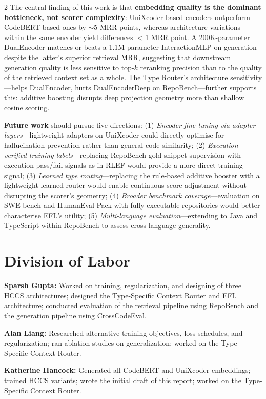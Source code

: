\documentclass[11pt,a4paper]{article}
\begin{document}
\begin{multicols}{2}
The central finding of this work is that \textbf{embedding quality is the dominant bottleneck, not scorer complexity}: UniXcoder-based encoders outperform CodeBERT-based ones by $\sim$5 MRR points, whereas architecture variations within the same encoder yield differences $<$1 MRR point. A 200K-parameter DualEncoder matches or beats a 1.1M-parameter InteractionMLP on generation despite the latter's superior retrieval MRR, suggesting that downstream generation quality is less sensitive to top-$k$ reranking precision than to the quality of the retrieved context set as a whole. The Type Router's architecture sensitivity---helps DualEncoder, hurts DualEncoderDeep on RepoBench---further supports this: additive boosting disrupts deep projection geometry more than shallow cosine scoring.

\textbf{Future work} should pursue five directions: (1) \textit{Encoder fine-tuning via adapter layers}---lightweight adapters on UniXcoder could directly optimise for hallucination-prevention rather than general code similarity; (2) \textit{Execution-verified training labels}---replacing RepoBench gold-snippet supervision with execution pass/fail signals as in RLEF \citep{gehring2024rlef} would provide a more direct training signal; (3) \textit{Learned type routing}---replacing the rule-based additive booster with a lightweight learned router would enable continuous score adjustment without disrupting the scorer's geometry; (4) \textit{Broader benchmark coverage}---evaluation on SWE-bench and HumanEval-Pack with fully executable repositories would better characterise EFL's utility; (5) \textit{Multi-language evaluation}---extending to Java and TypeScript within RepoBench to assess cross-language generality.

\section{Division of Labor}

\noindent\textbf{Sparsh Gupta:} Worked on training, regularization, and designing of three HCCS architectures; designed the Type-Specific Context Router and EFL architecture; conducted evaluation of the retrieval pipeline using RepoBench and the generation pipeline using CrossCodeEval.

\noindent\textbf{Alan Liang:} Researched alternative training objectives, loss schedules, and regularization; ran ablation studies on generalization; worked on the Type-Specific Context Router.

\noindent\textbf{Katherine Hancock:} Generated all CodeBERT and UniXcoder embeddings; trained HCCS variants; wrote the initial draft of this report; worked on the Type-Specific Context Router.


\end{multicols}
\end{document}

